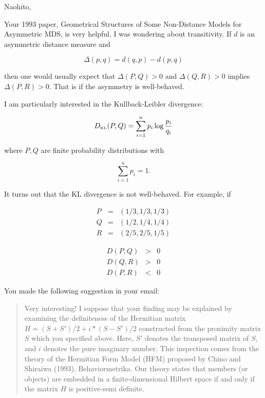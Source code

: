 \documentclass[landscape,10pt]{article}
\begin{document}
Naohito,

Your 1993 paper, Geometrical Structures of Some Non-Distance Models
for Asymmetric MDS, is very helpful. I was wondering about
transitivity. If $d$ is an asymmetric distance measure and

\begin{equation}
  \label{eq:e1}
  \Delta(p,q)=d(q,p)-d(p,q)
\end{equation}

then one would usually expect that $\Delta(P,Q)>0$ and $\Delta(Q,R)>0$
implies $\Delta(P,R)>0$. That is if the asymmetry is well-behaved.

I am particularly interested in the Kullback-Leibler divergence:

\begin{equation}
  \label{eq:e2}
  D_{\mbox{\tiny KL}}(P,Q)=\sum_{i=1}^{n}p_{i}\log\frac{p_{i}}{q_{i}}
\end{equation}

where $P,Q$ are finite probability distributions with

\begin{equation}
  \label{eq:e3}
  \sum_{i=1}^{n}p_{i}=1.
\end{equation}

It turns out that the KL divergence is not well-behaved. For example, if

\begin{eqnarray}
\label{eq:e4}
  P&=&(1/3,1/3,1/3)\\
  Q&=&(1/2,1/4,1/4)\\
  R&=&(2/5,2/5,1/5)
\end{eqnarray}

\begin{eqnarray}
\label{eq:e5}
D(P,Q)&>&0\\
D(Q,R)&>&0\\
D(P,R)&<&0
\end{eqnarray}

You made the following suggestion in your email:

\begin{quote}
  Very interesting! I suppose that your finding may be explained by
  examining the definiteness of the Hermitian matrix
  $H=(S+S')/2+i*(S-S')/2$ constructed from the proximity matrix $S$
  which you specified above. Here, $S'$ denotes the transposed matrix
  of $S$, and $i$ denotes the pure imaginary number. This inspection
  comes from the theory of the Hermitian Form Model (HFM) proposed by
  Chino and Shiraiwa (1993), Behaviormetrika. Our theory states that
  members (or objects) are embedded in a finite-dimensional Hilbert
  space if and only if the matrix $H$ is positive-semi definite.
\end{quote}
\end{document}
